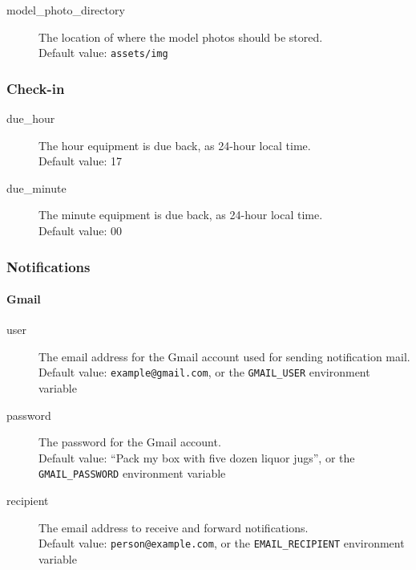 \begin{description}
  \item[model\_photo\_directory] The location of where the model photos should be stored.\\
    Default value: \texttt{assets/img}
\end{description}

\subsubsection{Check-in}
\label{subsubsec:server_config_checkin}

\begin{description}
  \item[due\_hour] The hour equipment is due back, as 24-hour local time.\\
    Default value: 17
  \item[due\_minute] The minute equipment is due back, as 24-hour local time.\\
    Default value: 00
\end{description}

\subsubsection{Notifications}
\label{subsubsec:server_config_notifications}

\paragraph{Gmail}
\label{par:gmail_notifications}

\begin{description}
  \item[user] The email address for the Gmail account used for sending notification mail.\\
    Default value: \texttt{example@gmail.com}, or the \texttt{GMAIL\_USER} environment variable
  \item[password] The password for the Gmail account.\\
    Default value: ``Pack my box with five dozen liquor jugs'', or the \texttt{GMAIL\_PASSWORD} environment variable
  \item[recipient] The email address to receive and forward notifications.\\
    Default value: \texttt{person@example.com}, or the \texttt{EMAIL\_RECIPIENT} environment variable
\end{description}

